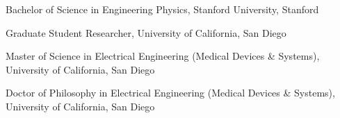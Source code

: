   \item[2013] Bachelor of Science in Engineering Physics,
  		Stanford University, Stanford 
  \item[2013 -- 2019] Graduate Student Researcher,
  		University of California, San Diego
  \item[2015] Master of Science in Electrical Engineering
  		(Medical Devices \& Systems),
  		University of California, San Diego
  \item[2019] Doctor of Philosophy in Electrical Engineering
  		(Medical Devices \& Systems),
  		University of California, San Diego 